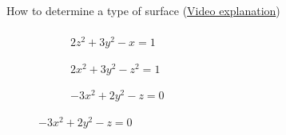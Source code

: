 \documentclass[aspectratio=169]{beamer}
\begin{document}
\begin{frame}[t]{How to determine a type of surface (\href{https://youtu.be/aM-0-oAppp0}{Video explanation})}
\framesubtitle{}
\vspace{-0.6cm}
\begin{figure}[H]
    \begin{subfigure}[t]{0.32\textwidth}
        \caption{$2z^2+3y^2-x=1$ \\ }
        \label{fig:1_1.png}
    \end{subfigure}
    \begin{subfigure}[t]{0.32\textwidth}
        \caption{$2x^2+3y^2-z^2=1$ \\ }
        \label{fig:1_2.png}
    \end{subfigure}
    \begin{subfigure}[t]{0.32\textwidth}
        \caption{$-3x^2+2y^2-z=0$ \\ }
        \label{fig:1_3.png}
    \end{subfigure}
\vspace{-0.3cm}


\end{figure}
\end{frame}
\end{document}

